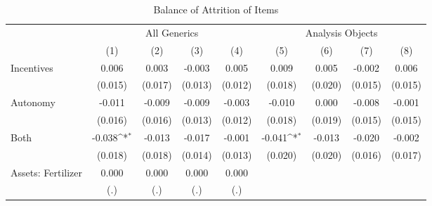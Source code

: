 {
\def\sym#1{\ifmmode^{#1}\else\(^{#1}\)\fi}
\begin{longtable}{l*{8}{c}}
\caption{Balance of Attrition of Items \label{tab:Attrition}}\\
\toprule\endfirsthead\midrule\endhead\midrule\endfoot\endlastfoot
                    &\multicolumn{4}{c}{All Generics}                                                       &\multicolumn{4}{c}{Analysis Objects}                                                   \\\cmidrule(lr){2-5}\cmidrule(lr){6-9}
                    &\multicolumn{1}{c}{(1)}         &\multicolumn{1}{c}{(2)}         &\multicolumn{1}{c}{(3)}         &\multicolumn{1}{c}{(4)}         &\multicolumn{1}{c}{(5)}         &\multicolumn{1}{c}{(6)}         &\multicolumn{1}{c}{(7)}         &\multicolumn{1}{c}{(8)}         \\
\midrule
Incentives          &       0.006         &       0.003         &      -0.003         &       0.005         &       0.009         &       0.005         &      -0.002         &       0.006         \\
                    &     (0.015)         &     (0.017)         &     (0.013)         &     (0.012)         &     (0.018)         &     (0.020)         &     (0.015)         &     (0.015)         \\
Autonomy            &      -0.011         &      -0.009         &      -0.009         &      -0.003         &      -0.010         &       0.000         &      -0.008         &      -0.001         \\
                    &     (0.016)         &     (0.016)         &     (0.013)         &     (0.012)         &     (0.018)         &     (0.019)         &     (0.015)         &     (0.015)         \\
Both                &      -0.038\sym{*}  &      -0.013         &      -0.017         &      -0.001         &      -0.041\sym{*}  &      -0.013         &      -0.020         &      -0.002         \\
                    &     (0.018)         &     (0.018)         &     (0.014)         &     (0.013)         &     (0.020)         &     (0.020)         &     (0.016)         &     (0.017)         \\
Assets: Fertilizer  &       0.000         &       0.000         &       0.000         &       0.000         &                     &                     &                     &                     \\
                    &         (.)         &         (.)         &         (.)         &         (.)         &                     &                     &                     &                     \\

\end{longtable}}
